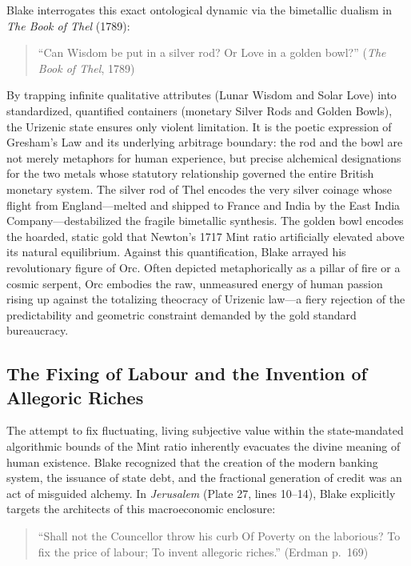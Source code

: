 \documentclass[
]{article}
\begin{document}
Blake interrogates this exact ontological dynamic via the bimetallic
dualism in \emph{The Book of Thel} (1789):

\begin{quote}
``Can Wisdom be put in a silver rod? Or Love in a golden bowl?''
(\emph{The Book of Thel}, 1789) \citep{blake1789thel}
\end{quote}

By trapping infinite qualitative attributes (Lunar Wisdom and Solar
Love) into standardized, quantified containers (monetary Silver Rods and
Golden Bowls), the Urizenic state ensures only violent limitation. It is
the poetic expression of Gresham's Law and its underlying arbitrage
boundary: the rod and the bowl are not merely metaphors for human
experience, but precise alchemical designations for the two metals whose
statutory relationship governed the entire British monetary system. The
silver rod of Thel encodes the very silver coinage whose flight from
England---melted and shipped to France and India by the East India
Company---destabilized the fragile bimetallic synthesis. The golden bowl
encodes the hoarded, static gold that Newton's 1717 Mint ratio
artificially elevated above its natural equilibrium. Against this
quantification, Blake arrayed his revolutionary figure of Orc. Often
depicted metaphorically as a pillar of fire or a cosmic serpent, Orc
embodies the raw, unmeasured energy of human passion rising up against
the totalizing theocracy of Urizenic law---a fiery rejection of the
predictability and geometric constraint demanded by the gold standard
bureaucracy.

\subsection{The Fixing of Labour and the Invention of Allegoric
Riches}\label{sec-allegoric-riches}

The attempt to fix fluctuating, living subjective value within the
state-mandated algorithmic bounds of the Mint ratio inherently evacuates
the divine meaning of human existence. Blake recognized that the
creation of the modern banking system, the issuance of state debt, and
the fractional generation of credit was an act of misguided alchemy. In
\emph{Jerusalem} (Plate 27, lines 10--14), Blake explicitly targets the
architects of this macroeconomic enclosure:

\begin{quote}
``Shall not the Councellor throw his curb Of Poverty on the laborious?
To fix the price of labour; To invent allegoric riches.'' (Erdman
p.~169) \citep{erdman1988complete, sklar2011blake}
\end{quote}
\end{document}

